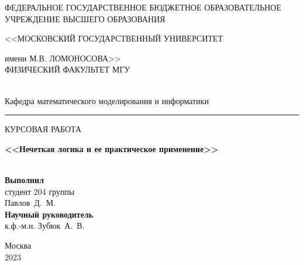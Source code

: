 \documentclass[a4paper,12pt]{article}
\begin{document}
	\begin{titlepage}
		\begin{center}
			
			
			
			{\small ФЕДЕРАЛЬНОЕ ГОСУДАРСТВЕННОЕ БЮДЖЕТНОЕ ОБРАЗОВАТЕЛЬНОЕ 
				УЧРЕЖДЕНИЕ ВЫСШЕГО ОБРАЗОВАНИЯ 
				
				<<МОСКОВСКИЙ ГОСУДАРСТВЕННЫЙ УНИВЕРСИТЕТ
				
				имени М.В. ЛОМОНОСОВА>>
				\ \\[1ex]
				ФИЗИЧЕСКИЙ ФАКУЛЬТЕТ МГУ }
			\ \\[0.8ex]
			Кафедра математического моделирования и информатики
			\ \\[0.8ex] 
			\hrule 
			
			\vspace{1cm}
			
			{\large КУРСОВАЯ РАБОТА}
			
			{\large\bf <<Нечеткая логика и ее практическое применение>> \\}
			\ \\[2ex]
			\begin{flushright}
				\begin{minipage}{0.42\textwidth}
					{\bf Выполнил}  \\ студент 204 группы \\ Павлов~Д.~М.
					\vspace{8mm}
					\vspace{1mm}
					{\small }
					\\[1ex]
					{\bf Научный руководитель} \\ к.ф.-м.н. Зубюк~А.~В.
					
					\vspace{40mm}
					
				\end{minipage}
			\end{flushright}
		\end{center}
		\hspace{3em}
		
		\vfill
		\vfill
		\begin{center}
			\vfill
			Москва\\
			2023
		\end{center}
		
	\end{titlepage}
	
	
	\newpage
	\setcounter{page}{2}
	
	\tableofcontents
	
	\newpage
	\setcounter{page}{3}
	\pagestyle{plain}
\end{document}
